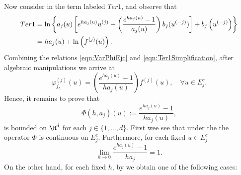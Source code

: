 \documentclass[sort&compress, preprint]{elsarticle}
\theoremstyle{definition}
\theoremstyle{plain}%
\theoremstyle{remark}
\begin{document}
\begin{pf}
	Now consider in  the term labeled $Ter1$, and observe that
	\begin{align}
		Ter1&=
			\ln\left\{
				a_j(u)\left[
					e^{ha_j(u)}u^{(j)} +
					\left(
						\frac{e^{ha_j(u)}-1}{a_j(u)}
					\right) b_j(u^{(-j)})	
				\right]
				+b_j\left(u^{(-j)}\right)
			\right\} \notag \\
		&=h a_j(u) + \ln \left( f^{(j)}(u) \right).
		\label{eqn:Ter1Simplification}		
	\end{align}
	Combining the relations \eqref{eqn:VarPhiEjc} and \eqref{eqn:Ter1Simplification},
	after algebraic manipulations we arrive at 
	\begin{equation}\label{eqn:VarPhiBound}
		\varphi_{f_h}^{(j)}(u) =
			\left(
				\frac{e^{ha_j(u)}-1}{h a_j(u)}
			\right)
			f^{(j)}(u), \quad \forall u \in E_j^c.
	\end{equation}
	Hence, it remains to prove that 
	\begin{equation}\label{eqn:ExpBound}
		\Phi(h, a_j)(u):=\frac{e^{ha_j(u)}-1}{ha_j(u)},
	\end{equation}
	is bounded on $\R^d$ for each $j\in \{ 1,\dots, d\}$.
	First wee see that under the  the operator $\Phi$ is continuous
	on $E_j^c$. Furthermore, for each fixed $u\in E_j^c$
	$$
		\lim_{h\to 0}
		\frac{e^{ha_j(u)}-1}{ha_j}=1.
	$$ 
	On the other hand, for each fixed $h$,  by  we obtain 
	one of the following cases:
	

\end{pf}
\end{document}
